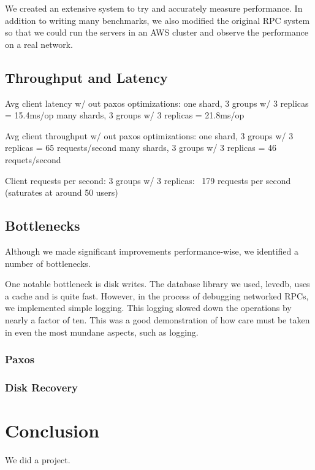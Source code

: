 \documentclass[letterpaper,10pt]{article}
\begin{document}
We created an extensive system to try and accurately measure performance. In addition to writing many benchmarks, we also modified the original RPC system so that we could run the servers in an AWS cluster and observe the performance on a real network. 

\subsection{Throughput and Latency}
Avg client latency w/ out paxos optimizations:
one shard, 3 groups w/ 3 replicas = 15.4ms/op
many shards, 3 groups w/ 3 replicas = 21.8ms/op

Avg client throughput w/ out paxos optimizations:
one shard, 3 groups w/ 3 replicas = 65 requests/second
many shards, 3 groups w/ 3 replicas = 46 requets/second

Client requests per second:
3 groups w/ 3 replicas:
~179 requests per second (saturates at around 50 users)


\subsection{Bottlenecks}
Although we made significant improvements performance-wise, we identified a number of bottlenecks.

One notable bottleneck is disk writes. The database library we used,
levedb, uses a cache and is quite fast. However, in the process of
debugging networked RPCs, we implemented simple logging. This logging
slowed down the operations by nearly a factor of ten. This was a good
demonstration of how care must be taken in even the most mundane
aspects, such as logging.

\subsubsection{Paxos}

\subsubsection{Disk Recovery}

\section{Conclusion}
We did a project.

\end{document}
